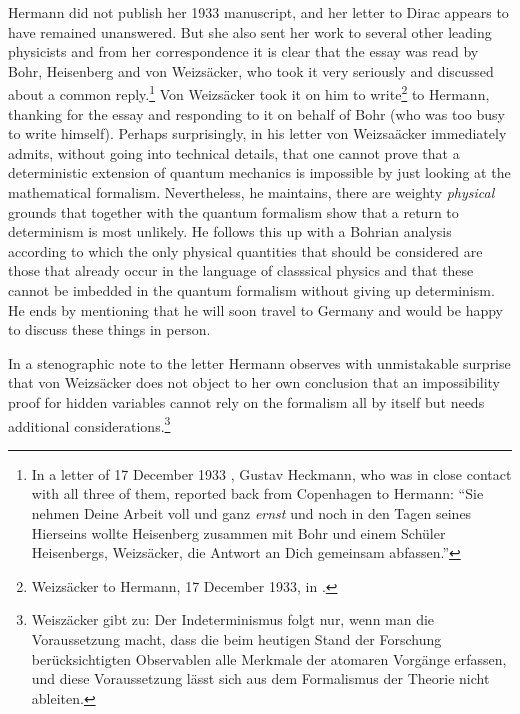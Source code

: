 \documentclass[12pt]{article}
\begin{document}
Hermann did not publish her 1933 manuscript, and her letter to Dirac appears to have remained unanswered. But she also sent her work to several other leading physicists and from her correspondence \cite{kay} it is clear that the essay was read by Bohr, Heisenberg and von Weizs\"{a}cker, who took it very seriously and discussed about a common reply.\footnote{In a letter of 17 December 1933 \cite{kay}, Gustav Heckmann, who was in close contact with all three of them, reported back from Copenhagen to Hermann: ``Sie nehmen Deine Arbeit voll und ganz \textit{ernst} und noch in den Tagen seines Hierseins wollte Heisenberg zusammen mit Bohr und einem Sch\"{u}ler Heisenbergs, Weizs\"{a}cker, die Antwort an Dich gemeinsam abfassen.'' } Von Weizs\"{a}cker took it on him to write\footnote{Weizs\"{a}cker to Hermann, 17 December 1933, in \cite{kay}.} to Hermann, thanking for the essay and responding to it on behalf of Bohr (who was too busy to write himself). Perhaps surprisingly, in his letter von Weizsa\"{a}cker immediately admits, without going into technical details, that one cannot prove that a deterministic extension of quantum mechanics is impossible by just looking at the mathematical formalism. Nevertheless, he maintains, there are weighty \emph{physical} grounds that together with the quantum formalism show that a return to determinism is most unlikely. He follows this up with a Bohrian analysis according to which the only physical quantities that should be considered are those that already occur in the language of classsical physics and that these cannot be imbedded in the quantum formalism without giving up determinism. He ends by mentioning that he will soon travel to Germany and would be happy to discuss these things in person. 

In a stenographic note to the letter Hermann observes with unmistakable surprise that von Weizs\"{a}cker does not object to her own conclusion that an impossibility proof for hidden variables cannot rely on the formalism all by itself but needs additional considerations.\footnote{Weisz\"{a}cker gibt zu: Der Indeterminismus folgt nur, wenn man die Voraussetzung macht, dass die beim heutigen Stand der Forschung ber\"{u}cksichtigten Observablen  alle Merkmale der atomaren Vorg\"{a}nge erfassen, und diese Voraussetzung l\"{a}sst sich aus dem Formalismus der Theorie nicht ableiten.}
\end{document}

